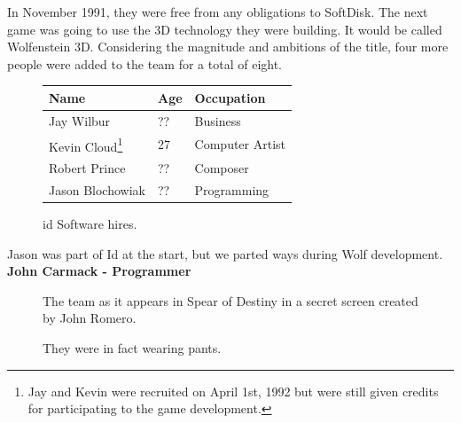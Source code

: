 \documentclass[book.tex]{subfiles}
\begin{document}
In November 1991, they were free from any obligations to SoftDisk. The next game was going to use the 3D technology they were building. It would be called Wolfenstein 3D. Considering the magnitude and ambitions of the title, four more people were added to the team for a total of eight.\\
 \begin{figure}[H]
\centering  
\begin{tabularx}{\textwidth}{ X  X  X  }
  \toprule
  \textbf{Name} &  \textbf{Age} & \textbf{Occupation} \\
  \toprule 
   Jay Wilbur & ?? &  Business\\
   Kevin Cloud\footnote{Jay and Kevin were recruited on April 1st, 1992 but were still given credits for participating to the game development.} & 27 &  Computer Artist\\
   Robert Prince & ?? &  Composer\\
   Jason Blochowiak & ?? &   Programming\\
     \toprule
\end{tabularx}
\caption{id Software hires.}\label{fig:Id Software hires}
\end{figure}

\begin{fancyquotes}
Jason was part of Id at the start, but we parted ways during Wolf development.
 \bigskip \\
\textbf{John Carmack - Programmer}
 \end{fancyquotes}
 
\begin{figure}[H]
\centering
\caption{The team as it appears in Spear of Destiny in a secret screen created by John Romero.}
\label{fig:id_team_1993}
\end{figure}
 
\begin{figure}[H]
\centering
\caption{They were in fact wearing pants.}
\label{fig:id_team_1993}
\end{figure}
\end{document}
